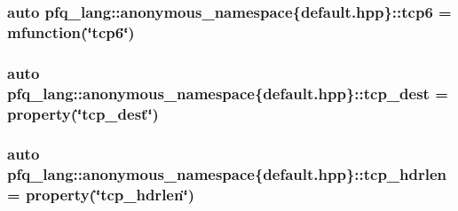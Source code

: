 \hypertarget{namespacepfq__lang_1_1anonymous__namespace_02default_8hpp_03_a734af11014e5ccaef77d6fa39cea0d6b}{
\subsubsection[{tcp6}]{\setlength{\rightskip}{0pt plus 5cm}auto pfq\+\_\+lang\+::anonymous\+\_\+namespace\{default.\+hpp\}\+::tcp6 = {\bf mfunction}(\char`\"{}tcp6\char`\"{})}}\label{namespacepfq__lang_1_1anonymous__namespace_02default_8hpp_03_a734af11014e5ccaef77d6fa39cea0d6b}
\hypertarget{namespacepfq__lang_1_1anonymous__namespace_02default_8hpp_03_a3123415d88452c599055bf8eaba2211e}{
\subsubsection[{tcp\+\_\+dest}]{\setlength{\rightskip}{0pt plus 5cm}auto pfq\+\_\+lang\+::anonymous\+\_\+namespace\{default.\+hpp\}\+::tcp\+\_\+dest = {\bf property}(\char`\"{}tcp\+\_\+dest\char`\"{})}}\label{namespacepfq__lang_1_1anonymous__namespace_02default_8hpp_03_a3123415d88452c599055bf8eaba2211e}
\hypertarget{namespacepfq__lang_1_1anonymous__namespace_02default_8hpp_03_aa8e6b2154ad12220fd1f348c37eaa621}{
\subsubsection[{tcp\+\_\+hdrlen}]{\setlength{\rightskip}{0pt plus 5cm}auto pfq\+\_\+lang\+::anonymous\+\_\+namespace\{default.\+hpp\}\+::tcp\+\_\+hdrlen = {\bf property}(\char`\"{}tcp\+\_\+hdrlen\char`\"{})}}\label{namespacepfq__lang_1_1anonymous__namespace_02default_8hpp_03_aa8e6b2154ad12220fd1f348c37eaa621}

